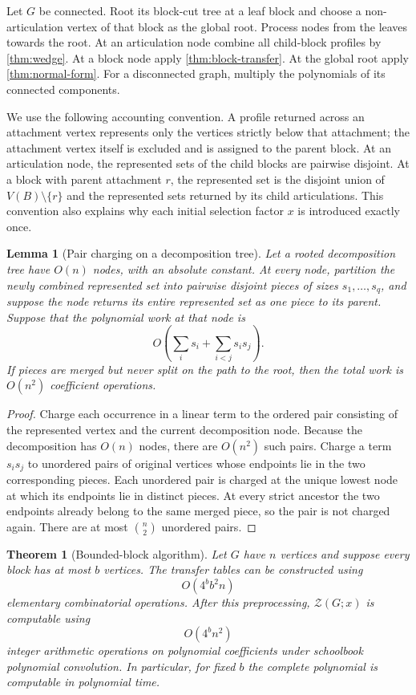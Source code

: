 \documentclass[11pt,reqno]{amsart}
\newtheorem{theorem}{Theorem}[section]
\newtheorem{lemma}[lemma]{Lemma}
\theoremstyle{definition}
\newcommand{\Zpoly}{\mathcal Z}
\begin{document}
Let $G$ be connected.  Root its block-cut tree at a leaf block and choose a
non-articulation vertex of that block as the global root.  Process nodes from
the leaves towards the root.  At an articulation node combine all child-block
profiles by \cref{thm:wedge}.  At a block node apply
\cref{thm:block-transfer}.  At the global root apply
\cref{thm:normal-form}.  For a disconnected graph, multiply the polynomials of
its connected components.

We use the following accounting convention.  A profile returned across an
attachment vertex represents only the vertices strictly below that attachment;
the attachment vertex itself is excluded and is assigned to the parent block.
At an articulation node, the represented sets of the child blocks are
pairwise disjoint.  At a block with parent attachment $r$, the represented set
is the disjoint union of $V(B)\setminus\{r\}$ and the represented sets returned
by its child articulations.  This convention also explains why each initial
selection factor $x$ is introduced exactly once.

\begin{lemma}[Pair charging on a decomposition tree]\label{lem:pair-charging}
Let a rooted decomposition tree have $O(n)$ nodes, with an absolute constant.
At every node, partition the newly combined represented set into pairwise
disjoint pieces of sizes $s_1,\ldots,s_q$, and suppose the node returns its
entire represented set as one piece to its parent.  Suppose that the polynomial
work at that node is
\[
  O\!\left(\sum_i s_i+\sum_{i<j}s_is_j\right).
\]
If pieces are merged but never split on the path to the root, then the total
work is $O(n^2)$ coefficient operations.
\end{lemma}

\begin{proof}
Charge each occurrence in a linear term to the ordered pair consisting of the
represented vertex and the current decomposition node.  Because the
decomposition has $O(n)$ nodes, there are $O(n^2)$ such pairs.  Charge a term $s_is_j$ to unordered pairs of original
vertices whose endpoints lie in the two corresponding pieces.  Each unordered
pair is charged at the unique lowest node at which its endpoints lie in
distinct pieces.  At every strict ancestor the two endpoints already belong to
the same merged piece, so the pair is not charged again.  There are at most
$\binom n2$ unordered pairs.
\end{proof}

\begin{theorem}[Bounded-block algorithm]\label{thm:bounded-block}
Let $G$ have $n$ vertices and suppose every block has at most $b$ vertices.
The transfer tables can be constructed using
\[
  O(4^{b}b^2n)
\]
elementary combinatorial operations.  After this preprocessing,
$\Zpoly(G;x)$ is computable using
\[
  \boxed{O(4^{b}n^2)}
\]
integer arithmetic operations on polynomial coefficients under schoolbook
polynomial convolution.  In particular, for fixed $b$ the complete polynomial is
computable in polynomial time.
\end{theorem}
\end{document}
